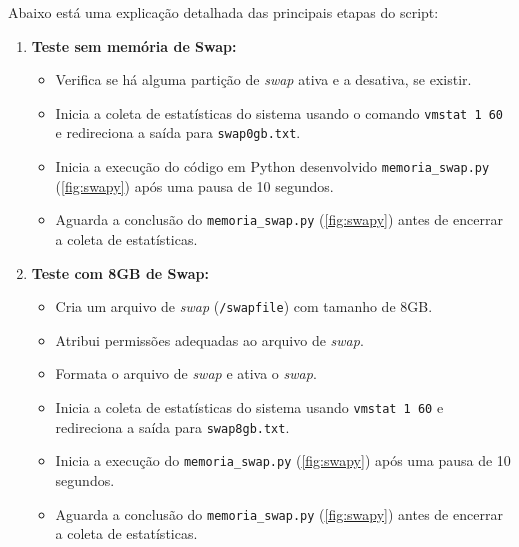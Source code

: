 \documentclass[
	12pt,				%
	openright,			%
	oneside,			%
	a4paper,			%
	chapter=TITLE,		%
	english,			%
	french,				%
	spanish,			%
	brazil				%
	]{abntex2}
\theoremstyle{definition}
\begin{document}
Abaixo está uma explicação detalhada das principais etapas do script:


\begin{enumerate}[label=\arabic*.]
    \item \textbf{Teste sem memória de Swap:}
    \begin{itemize}
        \item Verifica se há alguma partição de \textit{swap} ativa e a desativa, se existir.
        \item Inicia a coleta de estatísticas do sistema usando o comando \texttt{vmstat 1 60} e redireciona a saída para \texttt{swap0gb.txt}.
        \item Inicia a execução do código em Python desenvolvido \texttt{memoria\_swap.py} (\ref{fig:swapy})  após uma pausa de 10 segundos.
        \item Aguarda a conclusão do \texttt{memoria\_swap.py} (\ref{fig:swapy}) antes de encerrar a coleta de estatísticas.
    \end{itemize}

    \item \textbf{Teste com 8GB de Swap:}
    \begin{itemize}
        \item Cria um arquivo de \textit{swap} (\texttt{/swapfile}) com tamanho de 8GB.
        \item Atribui permissões adequadas ao arquivo de \textit{swap}.
        \item Formata o arquivo de \textit{swap} e ativa o \textit{swap}.
        \item Inicia a coleta de estatísticas do sistema usando \texttt{vmstat 1 60} e redireciona a saída para \texttt{swap8gb.txt}.
        \item Inicia a execução do \texttt{memoria\_swap.py} (\ref{fig:swapy}) após uma pausa de 10 segundos.
        \item Aguarda a conclusão do \texttt{memoria\_swap.py} (\ref{fig:swapy}) antes de encerrar a coleta de estatísticas.
    \end{itemize}


\end{enumerate}
\end{document}
